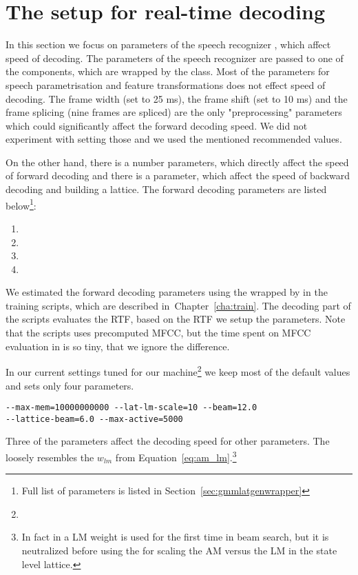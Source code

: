 \section{The setup for real-time decoding}
\label{sec:real-setup}

In this section we focus on parameters of the speech recognizer ,
which affect speed of decoding.
The parameters of the speech recognizer are passed to one of the components,
which are wrapped by the  class.
Most of the parameters for speech parametrisation and feature transformations 
does not effect speed of decoding. 
The frame width (set to 25 ms), the frame shift (set to 10 ms) and
the frame splicing (nine frames are spliced) 
are the only "preprocessing" parameters which could significantly affect the forward decoding speed.
We did not experiment with setting those and we used the mentioned recommended values.

On the other hand, there is a number  parameters,
which directly affect the speed of forward decoding and there is a  parameter,
which affect the speed of backward decoding and building a lattice.
The forward decoding parameters are listed below\footnote{Full list of parameters is listed in Section~\ref{sec:gmmlatgenwrapper}}:
\begin{enumerate}
    \item {} 
    \item {} 
    \item {} 
    \item {} 
\end{enumerate}

We estimated the forward decoding parameters using the 
wrapped by  in the training scripts,
which are described in~Chapter~\ref{cha:train}. The decoding part of the scripts evaluates 
the \ac{RTF}, based on the \ac{RTF} we setup the parameters. 
Note that the scripts uses precomputed \ac{MFCC}, but the time spent on \ac{MFCC} evaluation
in  is so tiny, that we ignore the difference.

In our current settings tuned for our machine\footnote{}
we keep most of the default values and sets only four parameters.
\begin{verbatim}
--max-mem=10000000000 --lat-lm-scale=10 --beam=12.0 
--lattice-beam=6.0 --max-active=5000
\end{verbatim}
Three of the parameters affect the decoding speed  for other parameters.
The  loosely resembles the $w_{lm}$ from 
Equation~\ref{eq:am_lm}.\footnote{In fact in  
    a \ac{LM} weight is used for the first time in beam search,
    but it is neutralized before using the  for scaling 
the \ac{AM} versus the \ac{LM} in the state level lattice.}

